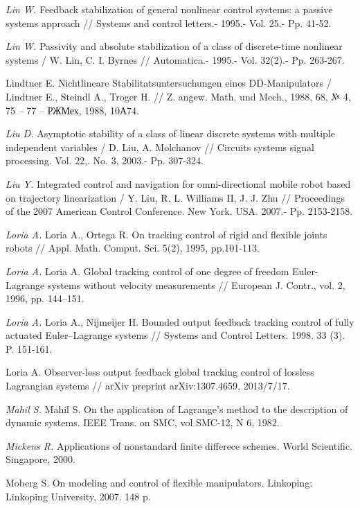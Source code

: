 \begin{thebibliography}{10}
	{\it Lin W.} Feedback stabilization of general nonlinear control systems: a passive systems approach // Systems and control letters.- 1995.- Vol. 25.- Pp. 41-52.
	
	{\it Lin W.} Passivity and absolute stabilization of a class of discrete-time nonlinear systems / W. Lin, C. I. Byrnes // Automatica.- 1995.- Vol. 32(2).- Pp. 263-267.
	
	Lindtner E. Nichtlineare Stabilitatsuntersuchungen eines DD-Manipulators / Lindtner E., Steindl A., Troger H. // Z. angew. Math. und Mech., 1988, 68, № 4, 75 – 77 – РЖМех, 1988, 10А74.
	
	{\it Liu D.} Asymptotic stability of a class of linear discrete systems with multiple independent variables / D. Liu, A. Molchanov // Circuits systems signal processing. Vol. 22,. No. 3, 2003.- Pp. 307-324.
	
	{\it Liu Y.} Integrated control and navigation for omni-directional mobile robot based on trajectory linearization / Y. Liu, R. L. Williams II, J. J. Zhu // Proceedings of the 2007 American Control Conference. New York. USA. 2007.- Pp. 2153-2158.
	
	{\it Loria A.} Loria A., Ortega R. On tracking control of rigid and flexible joints robots // Appl. Math. Comput. Sci. 5(2), 1995, pp.101-113.
	
	{\it Loria A.} Loria A. Global tracking control of one degree of freedom Euler-Lagrange systems without velocity measurements // European J. Contr., vol. 2, 1996, pp. 144–151.
	
	{\it Loria A.} Loria A., Nijmeijer H. Bounded output feedback tracking control of fully actuated Euler–Lagrange systems // Systems and Control Letters. 1998. 33 (3). P. 151-161.
	
	 Loria A. Observer-less output feedback global tracking control of lossless Lagrangian systems
	// arXiv preprint arXiv:1307.4659, 2013/7/17.
	
	{\it Mahil S.} Mahil S. On the application of Lagrange's method to the description of dynamic systems. IEEE Trans. on SMC, vol SMC-12, N 6, 1982.
	
	{\it Mickens R.} Applications of nonstandard finite differece schemes. World Scientific. Singapore, 2000.
	
	 Moberg S. On modeling and control of flexible manipulators. Linkoping: Linkoping University,
	2007. 148 p.
	

\end{thebibliography}
